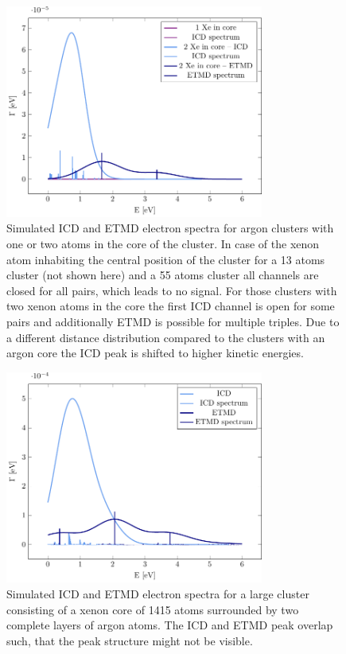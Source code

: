 \begin{figure}[h]
 \centering
 \includegraphics[width=8.5cm]{pics/xe_3_in.pdf}
 \caption{Simulated ICD and ETMD electron spectra for argon clusters with
          one or two atoms in the core of the cluster. In case of the xenon
          atom inhabiting the central position of the cluster for a 13 atoms
          cluster (not shown here) and a 55 atoms cluster all channels are closed
          for all pairs, which leads to no signal. For those clusters with two
          xenon atoms in the core the first ICD channel is open for some pairs
          and additionally ETMD is possible for multiple triples. Due to a
          different distance distribution compared to the clusters with an argon
          core the ICD peak is shifted to higher kinetic energies.}
 \label{figure:xe_3_in}
\end{figure}

\begin{figure}[h]
 \centering
 \includegraphics[width=8.5cm]{pics/xe_8_1lay.pdf}
 \caption{Simulated ICD and ETMD electron spectra for a large cluster consisting
          of a xenon core of 1415 atoms surrounded by two complete layers of
          argon atoms. The ICD and ETMD peak overlap such, that the peak structure
          might not be visible.}
 \label{figure:xe_8_lay1}
\end{figure}
